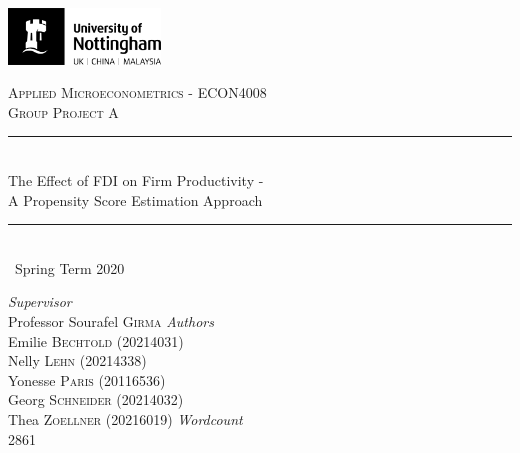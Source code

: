 \documentclass[a4paper,11pt]{scrartcl}
\newcommand{\sectionnumbering}[1]{%
  \setcounter{section}{0}%
   \renewcommand{\thesection}{\csname #1\endcsname{section}}}
\begin{document}
	\begin{titlepage}
		\newcommand{\HRule}{\rule{\linewidth}{0.5mm}}
		
	\vfill\vfill
	\includegraphics[height=1.5cm]{UoN_Logo}\\[1cm] 

	\vfill\vfill
	\center			
 
	\textsc{\Large Applied Microeconometrics - ECON4008}\\[0.5cm] 	
	\textsc{\large Group Project A}\\[0.5cm] 
	
	\HRule\\[0.4cm]
	{\huge The Effect of FDI on Firm Productivity - \\[0.4cm] A Propensity Score Estimation Approach}\\[0.4cm] 
	\HRule\\[0.4cm]
	
	{\large\ Spring Term 2020} 	
	\vfill\vfill\vfill\vfill	
	
\begin{flushleft}
			\large
			\textit{Supervisor}\\
			Professor Sourafel \textsc{Girma} 
			\vfill\vfill 
			\textit{Authors}\\
			Emilie \textsc{Bechtold} (20214031)\\
			Nelly  \textsc{Lehn} (20214338)\\
			Yonesse \textsc{Paris} (20116536)\\
			Georg  \textsc{Schneider} (20214032)\\
			Thea  \textsc{Zoellner} (20216019)
			\vfill \vfill 
			\textit{Wordcount}\\
			2861
			
		\end{flushleft}
	\vfill 


\end{titlepage}


\sectionnumbering{Roman}
\tableofcontents

\newpage

\listoftables
\listoffigures
\newpage
\end{document}

